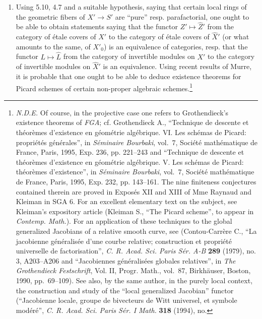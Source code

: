 \documentclass[
  11pt,
  a4paper,
]{book}
\begin{document}
\begin{enumerate}
\def\labelenumi{\arabic{enumi}.}
\item
  Using 5.10, 4.7 and a suitable hypothesis, saying that certain local
  rings of the geometric fibers of \(X' \to S'\) are ``pure'' resp.
  parafactorial, one ought to be able to obtain statements saying that
  the functor \(Z' \mapsto \hat{Z}'\) from the category of étale covers
  of \(X'\) to the category of étale covers of \(\hat{X}'\) (or what
  amounts to the same, of \(X'_{0}\)) is an equivalence of categories,
  resp. that the functor \(L \mapsto \hat{L}\) from the category of
  invertible modules on \(X'\) to the category of invertible modules on
  \(\hat{X}'\) is an equivalence. Using recent results of Murre, it is
  probable that one ought to be able to deduce existence theorems for
  Picard schemes of certain non-proper algebraic schemes.\footnote{\emph{N.D.E.}
    Of course, in the projective case one refers to Grothendieck's
    existence theorems of \emph{FGA}; cf. Grothendieck A., ``Technique
    de descente et théorèmes d'existence en géométrie algébrique. VI.
    Les schémas de Picard: propriétés générales'', in \emph{Séminaire
    Bourbaki}, vol.~7, Société mathématique de France, Paris, 1995, Exp.
    236, pp. 221--243 and ``Technique de descente et théorèmes
    d'existence en géométrie algébrique. V. Les schémas de Picard:
    théorèmes d'existence'', in \emph{Séminaire Bourbaki}, vol.~7,
    Société mathématique de France, Paris, 1995, Exp. 232, pp. 143--161.
    The nine finiteness conjectures contained therein are proved in
    Exposés XII and XIII of Mme Raynaud and Kleiman in SGA 6. For an
    excellent elementary text on the subject, see Kleiman's expository
    article (Kleiman S., ``The Picard scheme'', to appear in
    \emph{Contemp. Math.}). For an application of these techniques to
    the global generalized Jacobians of a relative smooth curve, see
    (Contou-Carrère C., ``La jacobienne généralisée d'une courbe
    relative; construction et propriété universelle de factorisation'',
    \emph{C. R. Acad. Sci. Paris Sér. A-B} \textbf{289} (1979), no. 3,
    A203--A206 and ``Jacobiennes généralisées globales relatives'', in
    \emph{The Grothendieck Festschrift}, Vol. II, Progr. Math., vol.~87,
    Birkhäuser, Boston, 1990, pp.~69--109). See also, by the same
    author, in the purely local context, the construction and study of
    the ``local generalized Jacobian'' functor (``Jacobienne locale,
    groupe de bivecteurs de Witt universel, et symbole modéré'',
    \emph{C. R. Acad. Sci. Paris Sér. I Math.} \textbf{318} (1994), no.
}
\end{enumerate}
\end{document}

